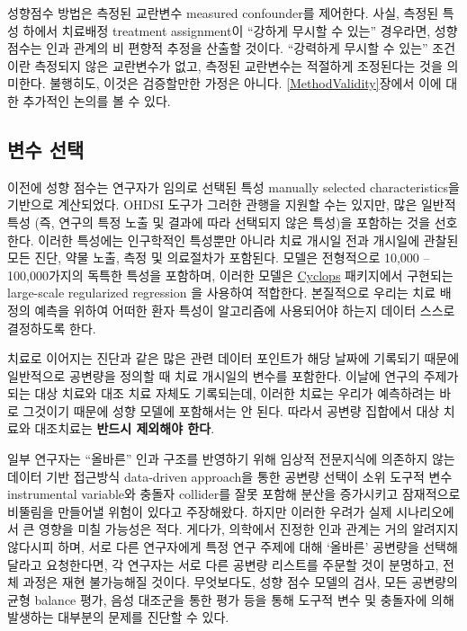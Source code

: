 \documentclass[10.5pt]{book}
\theoremstyle{definition}
\theoremstyle{definition}
\theoremstyle{definition}
\theoremstyle{remark}
\let\BeginKnitrBlock\begin \let\EndKnitrBlock\end
\begin{document}
성향점수 방법은 측정된 교란변수 measured confounder를 제어한다. 사실,
측정된 특성 하에서 치료배정 treatment assignment이 ``강하게 무시할 수
있는'' 경우라면, 성향 점수는 인과 관계의 비 편향적 추정을 산출할 것이다.
``강력하게 무시할 수 있는'' 조건이란 측정되지 않은 교란변수가 없고,
측정된 교란변수는 적절하게 조정된다는 것을 의미한다. 불행히도, 이것은
검증할만한 가정은 아니다. \ref{MethodValidity}장에서 이에 대한 추가적인
논의를 볼 수 있다. 

\subsection{변수 선택}\label{VariableSelection}

이전에 성향 점수는 연구자가 임의로 선택된 특성 manually selected
characteristics을 기반으로 계산되었다. OHDSI 도구가 그러한 관행을 지원할
수는 있지만, 많은 일반적 특성 (즉, 연구의 특정 노출 및 결과에 따라
선택되지 않은 특성)을 포함하는 것을 선호한다. \citep{tian_2018} 이러한
특성에는 인구학적인 특성뿐만 아니라 치료 개시일 전과 개시일에 관찰된
모든 진단, 약물 노출, 측정 및 의료절차가 포함된다. 모델은 전형적으로
10,000 -- 100,000가지의 독특한 특성을 포함하며, 이러한 모델은
\href{https://ohdsi.github.io/Cyclops/}{Cyclops} 패키지에서 구현되는
large-scale regularized regression \citep{suchard_2013} 을 사용하여
적합한다. 본질적으로 우리는 치료 배정의 예측을 위하여 어떠한 환자 특성이
알고리즘에 사용되어야 하는지 데이터 스스로 결정하도록 한다.

\BeginKnitrBlock{rmdimportant}
치료로 이어지는 진단과 같은 많은 관련 데이터 포인트가 해당 날짜에
기록되기 때문에 일반적으로 공변량을 정의할 때 치료 개시일의 변수를
포함한다. 이날에 연구의 주제가 되는 대상 치료와 대조 치료 자체도
기록되는데, 이러한 치료는 우리가 예측하려는 바로 그것이기 때문에 성향
모델에 포함해서는 안 된다. 따라서 공변량 집합에서 대상 치료와 대조치료는
\textbf{반드시 제외해야 한다}.
\EndKnitrBlock{rmdimportant}

일부 연구자는 ``올바른'' 인과 구조를 반영하기 위해 임상적 전문지식에
의존하지 않는 데이터 기반 접근방식 data-driven approach을 통한 공변량
선택이 소위 도구적 변수 instrumental variable와 충돌자 collider를 잘못
포함해 분산을 증가시키고 잠재적으로 비뚤림을 만들어낼 위험이 있다고
주장해왔다. \citep{hernan_2002} 하지만 이러한 우려가 실제 시나리오에서
큰 영향을 미칠 가능성은 적다. \citep{schneeweiss_2018} 게다가, 의학에서
진정한 인과 관계는 거의 알려지지 않다시피 하며, 서로 다른 연구자에게
특정 연구 주제에 대해 `올바른' 공변량을 선택해 달라고 요청한다면, 각
연구자는 서로 다른 공변량 리스트를 주문할 것이 분명하고, 전체 과정은
재현 불가능해질 것이다. 무엇보다도, 성향 점수 모델의 검사, 모든 공변량의
균형 balance 평가, 음성 대조군을 통한 평가 등을 통해 도구적 변수 및
충돌자에 의해 발생하는 대부분의 문제를 진단할 수 있다.
 
\end{document}
